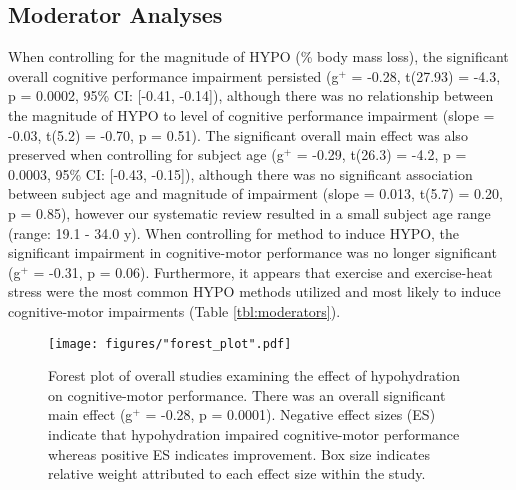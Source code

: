 \subsection{Moderator Analyses}
When controlling for the magnitude of HYPO (\% body mass loss), the significant overall cognitive performance impairment persisted (g${^+}$ = -0.28, t(27.93) = -4.3, p = 0.0002, 95\% CI: [-0.41, -0.14]), although there was no relationship between the magnitude of HYPO to level of cognitive performance impairment (slope = -0.03, t(5.2) = -0.70, p = 0.51). The significant overall main effect was also preserved when controlling for subject age (g${^+}$ = -0.29, t(26.3) = -4.2, p = 0.0003, 95\% CI: [-0.43, -0.15]), although there was no significant association between subject age and magnitude of impairment (slope = 0.013, t(5.7) = 0.20, p = 0.85), however our systematic review resulted in a small subject age range (range: 19.1 - 34.0 y). When controlling for method to induce HYPO, the significant impairment in cognitive-motor performance was no longer significant (g${^+}$ = -0.31, p = 0.06). Furthermore, it appears that exercise and exercise-heat stress were the most common HYPO methods utilized and most likely to induce cognitive-motor impairments (Table \ref{tbl:moderators}). 

\begin{figure}
	\centering
	\texttt{[image: figures/"forest\_plot".pdf]}
	\caption{Forest plot of overall studies examining the effect of hypohydration on cognitive-motor performance. There was an overall significant main effect (g${^+}$ = -0.28, p = 0.0001). Negative effect sizes (ES) indicate that hypohydration impaired cognitive-motor performance whereas positive ES indicates improvement. Box size indicates relative weight attributed to each effect size within the study.}
	\label{fig:forest_plot}
\end{figure}

